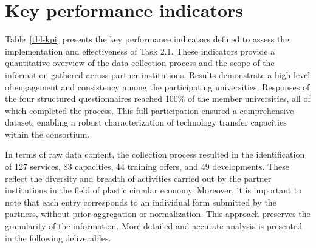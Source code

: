 \documentclass[
  12pt,
  oneside]{book}
\begin{document}
\section{Key performance indicators}\label{key-performance-indicators}

Table~\ref{tbl-kpi} presents the key performance indicators defined to
assess the implementation and effectiveness of Task 2.1. These
indicators provide a quantitative overview of the data collection
process and the scope of the information gathered across partner
institutions. Results demonstrate a high level of engagement and
consistency among the participating universities. Responses of the four
structured questionnaires reached 100\% of the member universities, all
of which completed the process. This full participation ensured a
comprehensive dataset, enabling a robust characterization of technology
transfer capacities within the consortium.

In terms of raw data content, the collection process resulted in the
identification of 127 services, 83 capacities, 44 training offers, and
49 developments. These reflect the diversity and breadth of activities
carried out by the partner institutions in the field of plastic circular
economy. Moreover, it is important to note that each entry corresponds
to an individual form submitted by the partners, without prior
aggregation or normalization. This approach preserves the granularity of
the information. More detailed and accurate analysis is presented in the
following deliverables.
\end{document}

